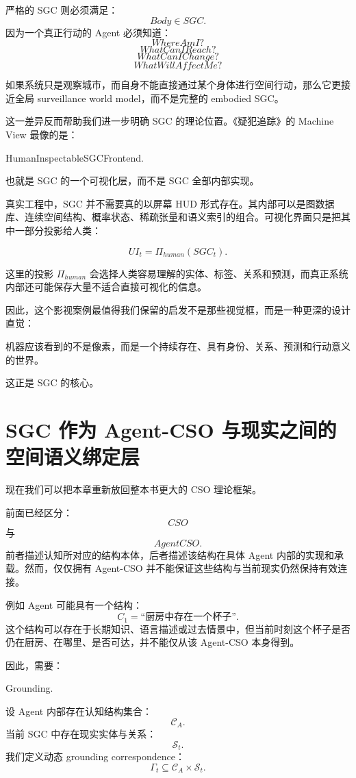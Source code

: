 严格的 SGC 则必须满足：
\[
Body\in SGC.
\]
因为一个真正行动的 Agent 必须知道：
\[
WhereAmI?
\]
\[
WhatCanIReach?
\]
\[
WhatCanIChange?
\]
\[
WhatWillAffectMe?
\]

如果系统只是观察城市，而自身不能直接通过某个身体进行空间行动，那么它更接近全局 surveillance world model，而不是完整的 embodied SGC。

这一差异反而帮助我们进一步明确 SGC 的理论位置。《疑犯追踪》的 Machine View 最像的是：
\begin{statementbox}
HumanInspectableSGCFrontend.
\end{statementbox}
也就是 SGC 的一个可视化层，而不是 SGC 全部内部实现。

真实工程中，SGC 并不需要真的以屏幕 HUD 形式存在。其内部可以是图数据库、连续空间结构、概率状态、稀疏张量和语义索引的组合。可视化界面只是把其中一部分投影给人类：

\[
UI_t
=
\Pi_{human}
(
SGC_t
).
\]

这里的投影 \(\Pi_{human}\) 会选择人类容易理解的实体、标签、关系和预测，而真正系统内部还可能保存大量不适合直接可视化的信息。

因此，这个影视案例最值得我们保留的启发不是那些视觉框，而是一种更深的设计直觉：

\begin{statementbox}
机器应该看到的不是像素，而是一个持续存在、具有身份、关系、预测和行动意义的世界。
\end{statementbox}

这正是 SGC 的核心。

\section{SGC 作为 Agent-CSO 与现实之间的空间语义绑定层}

现在我们可以把本章重新放回整本书更大的 CSO 理论框架。

前面已经区分：
\[
CSO
\]
与
\[
AgentCSO.
\]
前者描述认知所对应的结构本体，后者描述该结构在具体 Agent 内部的实现和承载。然而，仅仅拥有 Agent-CSO 并不能保证这些结构与当前现实仍然保持有效连接。

例如 Agent 可能具有一个结构：
\[
C_1=
\text{``厨房中存在一个杯子''}.
\]
这个结构可以存在于长期知识、语言描述或过去情景中，但当前时刻这个杯子是否仍在厨房、在哪里、是否可达，并不能仅从该 Agent-CSO 本身得到。

因此，需要：
\begin{statementbox}
Grounding.
\end{statementbox}

设 Agent 内部存在认知结构集合：
\[
\mathcal C_A.
\]
当前 SGC 中存在现实实体与关系：
\[
\mathcal S_t.
\]
我们定义动态 grounding correspondence：
\[
\Gamma_t
\subseteq
\mathcal C_A
\times
\mathcal S_t.
\]

